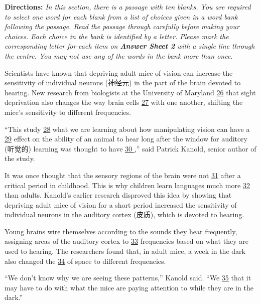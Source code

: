 \documentclass[UTF8,11pt]{ctexart}
\begin{document}
\textbf{Directions:} \textit{In this section, there is a passage with ten blanks. You are required to select one word for each blank} \textit{from a list of choices given in a word bank following the passage. Read the passage through carefully before} \textit{making your choices. Each choice in the bank is identified by a letter. Please mark the corresponding letter for} \textit{each item on }\textbf{\textit{Answer Sheet 2}}\textit{ with a single line through the centre. You may not use any of the words in the bank} \textit{more than once.}


Scientists have known that depriving adult mice of vision can increase the sensitivity of individual neurons (神经元) in the part of the brain devoted to hearing. New research from biologists at the University of Maryland \uline{26} that sight deprivation also changes the way brain cells \uline{27} with one another, shifting the mice’s sensitivity to different frequencies.


“This study \uline{28} what we are learning about how manipulating vision can have a \uline{29} effect on the ability of an animal to hear long after the window for auditory (听觉的) learning was thought to have \uline{30 },” said Patrick Kanold, senior author of the study.


It was once thought that the sensory regions of the brain were not \uline{31} after a critical period in childhood. This is why children learn languages much more \uline{32} than adults. Kanold’s earlier research disproved this idea by showing that depriving adult mice of vision for a short period increased the sensitivity of individual neurons in the auditory cortex (皮质), which is devoted to hearing.


Young brains wire themselves according to the sounds they hear frequently, assigning areas of the auditory cortex to \uline{33} frequencies based on what they are used to hearing. The researchers found that, in adult mice, a week in the dark also changed the \uline{34} of space to different frequencies.


“We don’t know why we are seeing these patterns,” Kanold said. “We \uline{35} that it may have to do with what the mice are paying attention to while they are in the dark.”
\end{document}
